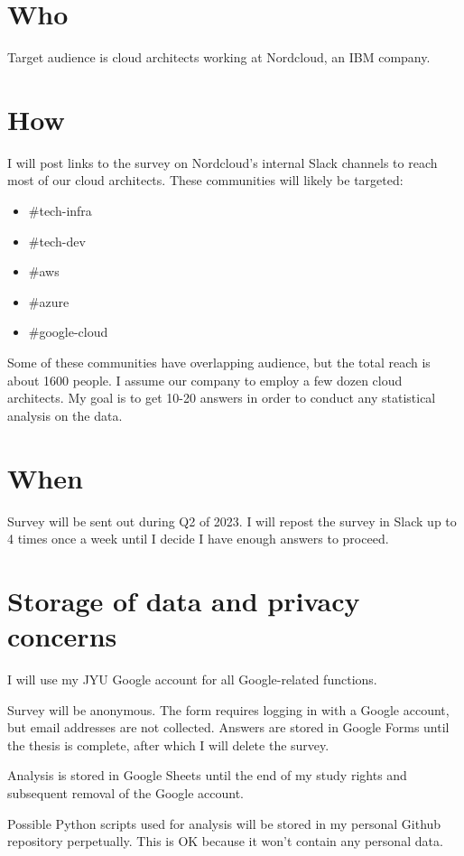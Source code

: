 \documentclass[utf8,english]{gradu3}
\begin{document}
\section{Who}

Target audience is cloud architects working at Nordcloud, an IBM company.

\section{How}
I will post links to the survey on Nordcloud's internal Slack channels to reach
most of our cloud architects.
These communities will likely be targeted:
\begin{itemize}
  \item \#tech-infra
  \item \#tech-dev
  \item \#aws
  \item \#azure
  \item \#google-cloud
\end{itemize}

Some of these communities have overlapping audience, but the total reach is about 1600 people.
I assume our company to employ a few dozen cloud architects.
My goal is to get 10-20 answers in order to conduct any statistical analysis on
the data.

\section{When}
Survey will be sent out during Q2 of 2023.
I will repost the survey in Slack up to 4 times once a week until I decide I
have enough answers to proceed.

\section{Storage of data and privacy concerns}
I will use my JYU Google account for all Google-related functions.

Survey will be anonymous.
The form requires logging in with a Google account, but email addresses are not collected.
Answers are stored in Google Forms until the thesis is complete,
after which I will delete the survey.

Analysis is stored in Google Sheets until the end of my study rights and
subsequent removal of the Google account.

Possible Python scripts used for analysis will be stored in my personal Github repository
perpetually.
This is OK because it won't contain any personal data.
\end{document}
